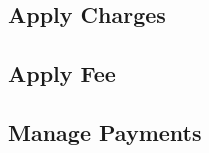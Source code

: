 \subsection{Apply Charges} \label{apply_charges_section}


\subsection{Apply Fee}


\subsection{Manage Payments} \label{man_pay}
